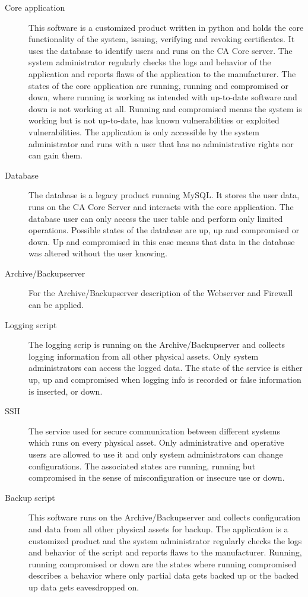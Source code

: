 \documentclass[a4paper, toc=index, 12pt, DIV14, twoside, BCOR2cm, headsepline, numbers=noenddot, bibliography=totoc]{report}
\begin{document}
\begin{description}
\item[Core application ] This software is a customized product written in python and holds the core functionality of the system, issuing, verifying and revoking certificates. It uses the database to identify users and runs on the CA Core server. The system administrator regularly checks the logs and behavior of the application and reports flaws of the application to the manufacturer. The states of the core application are running, running and compromised or down, where running is working as intended with up-to-date software and down is not working at all. Running and compromised means the system is working but is not up-to-date, has known vulnerabilities or exploited vulnerabilities. The application is only accessible by the system administrator and runs with a user that has no administrative rights nor can gain them.
\item[Database ] The database is a legacy product running MySQL. It stores the user data, runs on the CA Core Server and interacts with the core application. The database user can only access the user table and perform only limited operations. Possible states of the database are up, up and compromised or down. Up and compromised in this case means that data in the database was altered without the user knowing.
\item[Archive/Backupserver ] For the Archive/Backupserver description of the Webserver and Firewall can be applied.
\item[Logging script] The logging scrip is running on the Archive/Backupserver and collects logging information from all other physical assets. Only system administrators can access the logged data. The state of the service is either up, up and compromised when logging info is recorded or false information is inserted, or down.
\item[SSH ] The service used for secure communication between different systems which runs on every physical asset. Only administrative and operative users are allowed to use it and only system administrators can change configurations. The associated states are running, running but compromised in the sense of misconfiguration or insecure use or down.
\item[Backup script ] This software runs on the Archive/Backupserver and collects configuration and data from all other physical assets for backup. The application is a customized product and the system administrator regularly checks the logs and behavior of the script and reports flaws to the manufacturer. Running, running compromised or down are the states where running compromised describes a behavior where only partial data gets backed up or the backed up data gets eavesdropped on.
\end{description}
\end{document}
